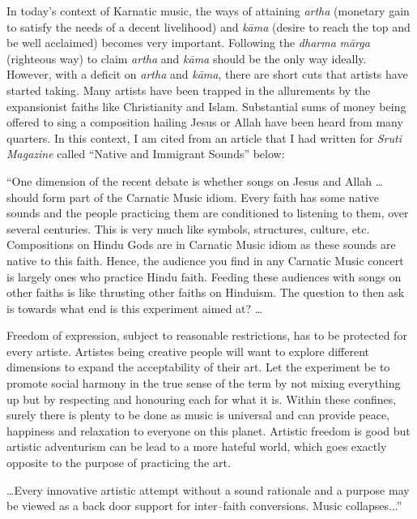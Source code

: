 In today’s context of Karnatic music, the ways of attaining \textit{artha} (monetary gain to satisfy the needs of a decent livelihood) and \textit{kāma} (desire to reach the top and be well acclaimed) becomes very important. Following the \textit{dharma} \textit{mārga} (righteous way) to claim \textit{artha} and \textit{kāma} should be the only way ideally. However, with a deficit on \textit{artha} and \textit{kāma}, there are short cuts that artists have started taking. Many artists have been trapped in the allurements by the expansionist faiths like Christianity and Islam. Substantial sums of money being offered to sing a composition hailing Jesus or Allah have been heard from many quarters. In this context, I am cited from an article that I had written for \textit{Sruti Magazine} called “Native and Immigrant Sounds” below:

\begin{myquote}
“One dimension of the recent debate is whether songs on Jesus and Allah … should form part of the Carnatic Music idiom. Every faith has some native sounds and the people practicing them are conditioned to listening to them, over several centuries. This is very much like symbols, structures, culture, etc. Compositions on Hindu Gods are in Carnatic Music idiom as these sounds are native to this faith. Hence, the audience you find in any Carnatic Music concert is largely ones who practice Hindu faith. Feeding these audiences with songs on other faiths is like thrusting other faiths on Hinduism. The question to then ask is towards what end is this experiment aimed at? …
\end{myquote}

\begin{myquote}
Freedom of expression, subject to reasonable restrictions, has to be protected for every artiste. Artistes being creative people will want to explore different dimensions to expand the acceptability of their art. Let the experiment be to promote social harmony in the true sense of the term by not mixing everything up but by respecting and honouring each for what it is. Within these confines, surely there is plenty to be done as music is universal and can provide peace, happiness and relaxation to everyone on this planet. Artistic freedom is good but artistic adventurism can be lead to a more hateful world, which goes exactly opposite to the purpose of practicing the art.
\end{myquote}

\begin{myquote}
…Every innovative artistic attempt without a sound rationale and a purpose may be viewed as a back door support for inter–faith conversions. Music collapses...”
\end{myquote}


